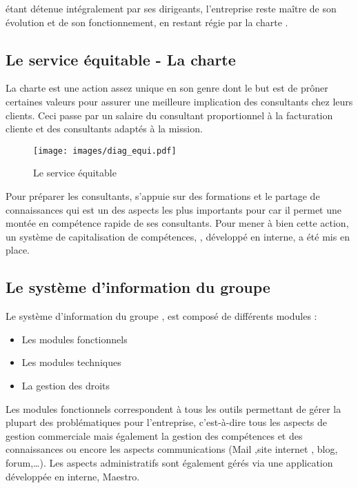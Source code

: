 \ebi{} étant détenue intégralement par ses dirigeants, l'entreprise reste maître de son évolution et de son fonctionnement, en restant régie par la charte \excilys{}.

\subsection{Le service équitable - La charte \excilys{}}

La charte \excilys{} est une action assez unique en son genre dont le but est de prôner certaines valeurs pour assurer une meilleure implication des consultants chez leurs clients. Ceci passe par un salaire du consultant proportionnel à la facturation cliente et des consultants adaptés à la mission.

\begin{figure}[H]
	\centering
	\texttt{[image: images/diag\_equi.pdf]}
	\caption{Le service équitable}
\end{figure}

Pour préparer les consultants, \ebi{} s’appuie sur des formations et le partage de connaissances qui est un des aspects les plus importants pour \excilys{} car il permet une montée en compétence rapide de ses consultants. Pour mener à bien cette action, un système de capitalisation de compétences, \capico{} \cite{capico}, développé en interne, a été mis en place.

\subsection{Le système d'information du groupe}

Le système d'information du groupe \excilys{}, est composé de différents modules : 

\begin{itemize}
	\item Les modules fonctionnels 
	\item Les modules techniques
	\item La gestion des droits\\
\end{itemize}

Les modules fonctionnels correspondent à tous les outils permettant de gérer la plupart des problématiques pour l'entreprise, c’est-à-dire tous les aspects de gestion commerciale mais également la gestion des compétences et des connaissances ou encore les aspects communications (Mail ,site internet , blog, forum,\ldots). Les aspects administratifs sont également gérés via une application développée en interne, Maestro.\\

